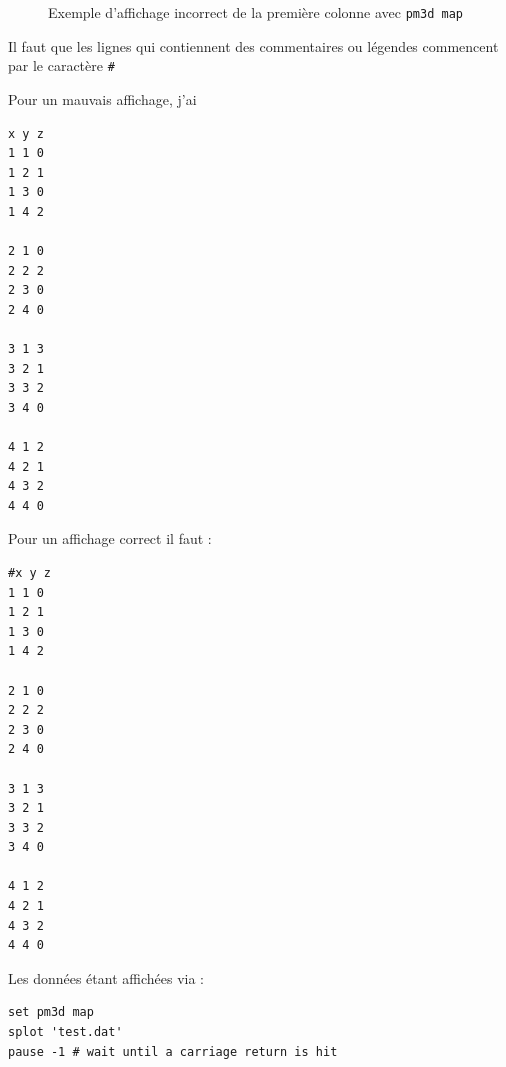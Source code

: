\documentclass[a4paper,twoside]{article}
\begin{document}
\begin{figure}[htb]
\centering
{}\hfill
{}
\caption{Exemple d'affichage incorrect de la première colonne avec \texttt{pm3d map}}
\end{figure}

\begin{important}
Il faut que les lignes qui contiennent des commentaires ou légendes commencent par le caractère \verb|#|
\end{important}


Pour un mauvais affichage, j'ai 
\begin{verbatim}
x y z
1 1 0
1 2 1
1 3 0
1 4 2

2 1 0
2 2 2
2 3 0
2 4 0

3 1 3
3 2 1
3 3 2
3 4 0

4 1 2
4 2 1
4 3 2
4 4 0
\end{verbatim}

Pour un affichage correct il faut : 
\begin{verbatim}
#x y z
1 1 0
1 2 1
1 3 0
1 4 2

2 1 0
2 2 2
2 3 0
2 4 0

3 1 3
3 2 1
3 3 2
3 4 0

4 1 2
4 2 1
4 3 2
4 4 0
\end{verbatim}

\begin{remarque}
Les données étant affichées via : 
\begin{verbatim}
set pm3d map
splot 'test.dat'
pause -1 # wait until a carriage return is hit
\end{verbatim}

\end{remarque}



\printindex
\end{document}
